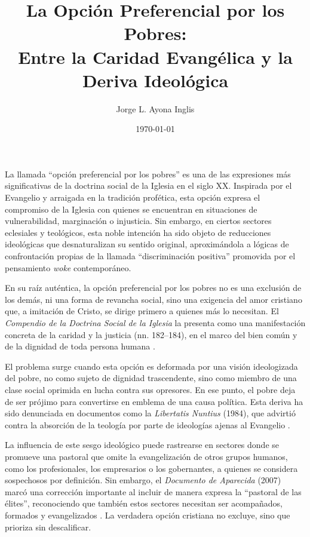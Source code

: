 \documentclass[12pt]{article}
\title{La Opción Preferencial por los Pobres:\\Entre la Caridad Evangélica y la Deriva Ideológica}
\author{Jorge L. Ayona Inglis}
\date{\today}
\begin{document}
\maketitle
\onehalfspacing

\noindent
La llamada “opción preferencial por los pobres” es una de las expresiones más significativas de la doctrina social de la Iglesia en el siglo XX. Inspirada por el Evangelio y arraigada en la tradición profética, esta opción expresa el compromiso de la Iglesia con quienes se encuentran en situaciones de vulnerabilidad, marginación o injusticia. Sin embargo, en ciertos sectores eclesiales y teológicos, esta noble intención ha sido objeto de reducciones ideológicas que desnaturalizan su sentido original, aproximándola a lógicas de confrontación propias de la llamada “discriminación positiva” promovida por el pensamiento \textit{woke} contemporáneo.

En su raíz auténtica, la opción preferencial por los pobres no es una exclusión de los demás, ni una forma de revancha social, sino una exigencia del amor cristiano que, a imitación de Cristo, se dirige primero a quienes más lo necesitan. El \textit{Compendio de la Doctrina Social de la Iglesia} la presenta como una manifestación concreta de la caridad y la justicia (nn. 182–184), en el marco del bien común y de la dignidad de toda persona humana \cite{compendio}.

El problema surge cuando esta opción es deformada por una visión ideologizada del pobre, no como sujeto de dignidad trascendente, sino como miembro de una clase social oprimida en lucha contra sus opresores. En ese punto, el pobre deja de ser prójimo para convertirse en emblema de una causa política. Esta deriva ha sido denunciada en documentos como la \textit{Libertatis Nuntius} (1984), que advirtió contra la absorción de la teología por parte de ideologías ajenas al Evangelio \cite{libertatis}.

La influencia de este sesgo ideológico puede rastrearse en sectores donde se promueve una pastoral que omite la evangelización de otros grupos humanos, como los profesionales, los empresarios o los gobernantes, a quienes se considera sospechosos por definición. Sin embargo, el \textit{Documento de Aparecida} (2007) marcó una corrección importante al incluir de manera expresa la “pastoral de las élites”, reconociendo que también estos sectores necesitan ser acompañados, formados y evangelizados \cite{aparecida}. La verdadera opción cristiana no excluye, sino que prioriza sin descalificar.
\end{document}
